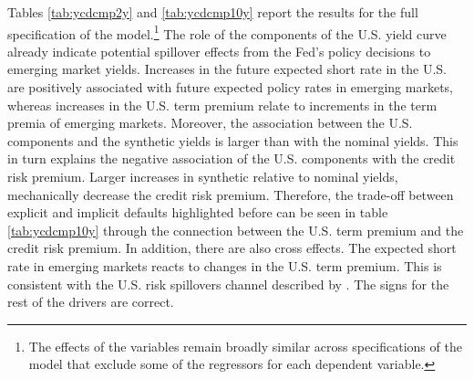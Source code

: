 {Tables \ref{tab:ycdcmp2y} and \ref{tab:ycdcmp10y} report the results for the full specification of the model.\footnote{ The effects of the variables remain broadly similar across specifications of the model that exclude some of the regressors for each dependent variable.} 
The role of the components of the U.S. yield curve %
already indicate potential spillover effects from the Fed's policy decisions to emerging market yields.
Increases in the future expected short rate in the U.S. are positively associated with future expected policy rates in emerging markets, whereas increases in the U.S. term premium relate to increments in the term premia of emerging markets.
Moreover, the association between the U.S. components and the synthetic yields is larger than with the nominal yields. This in turn explains the negative association of the U.S. components with the credit risk premium.
Larger increases in synthetic relative to nominal yields, mechanically decrease the credit risk premium.
Therefore, the trade-off between explicit and implicit defaults highlighted before can be seen in table \ref{tab:ycdcmp10y} through the connection between the U.S. term premium and the credit risk premium.
In addition, there are also cross effects. 
The expected short rate in emerging markets reacts to changes in the U.S. term premium. 
This is consistent with the U.S. risk spillovers channel described by \cite{Kalemli-Ozcan:2019}.
The signs for the rest of the drivers are correct.




}
